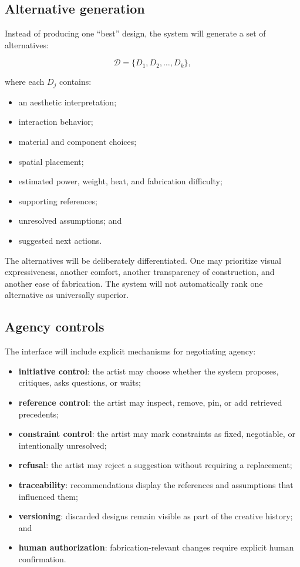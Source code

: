 \documentclass{article}
\begin{document}
\subsection{Alternative generation}

Instead of producing one ``best'' design, the system will generate a set of
alternatives:

\begin{equation}
\mathcal{D} = \{D_1, D_2, \dots, D_k\},
\end{equation}

where each $D_j$ contains:

\begin{itemize}[leftmargin=*]
    \item an aesthetic interpretation;
    \item interaction behavior;
    \item material and component choices;
    \item spatial placement;
    \item estimated power, weight, heat, and fabrication difficulty;
    \item supporting references;
    \item unresolved assumptions; and
    \item suggested next actions.
\end{itemize}

The alternatives will be deliberately differentiated. One may prioritize
visual expressiveness, another comfort, another transparency of construction,
and another ease of fabrication. The system will not automatically rank one
alternative as universally superior.

\subsection{Agency controls}

The interface will include explicit mechanisms for negotiating agency:

\begin{itemize}[leftmargin=*]
    \item \textbf{initiative control}: the artist may choose whether the system
    proposes, critiques, asks questions, or waits;
    \item \textbf{reference control}: the artist may inspect, remove, pin, or add
    retrieved precedents;
    \item \textbf{constraint control}: the artist may mark constraints as fixed,
    negotiable, or intentionally unresolved;
    \item \textbf{refusal}: the artist may reject a suggestion without requiring
    a replacement;
    \item \textbf{traceability}: recommendations display the references and
    assumptions that influenced them;
    \item \textbf{versioning}: discarded designs remain visible as part of the
    creative history; and
    \item \textbf{human authorization}: fabrication-relevant changes require
    explicit human confirmation.
\end{itemize}
\end{document}
